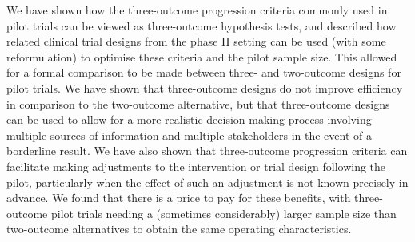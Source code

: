 \documentclass{bmcart}
\begin{document}





We have shown how the three-outcome progression criteria commonly used in pilot trials can be viewed as three-outcome hypothesis tests, and described how related clinical trial designs from the phase II setting can be used (with some reformulation) to optimise these criteria and the pilot sample size. This allowed for a formal comparison to be made between three- and two-outcome designs for pilot trials. We have shown that three-outcome designs do not improve efficiency in comparison to the two-outcome alternative, but that three-outcome designs can be used to allow for a more realistic decision making process involving multiple sources of information and multiple stakeholders in the event of a borderline result. We have also shown that three-outcome progression criteria can facilitate making adjustments to the intervention or trial design following the pilot, particularly when the effect of such an adjustment is not known precisely in advance. We found that there is a price to pay for these benefits, with three-outcome pilot trials needing a (sometimes considerably) larger sample size than two-outcome alternatives to obtain the same operating characteristics.  
\end{document}
